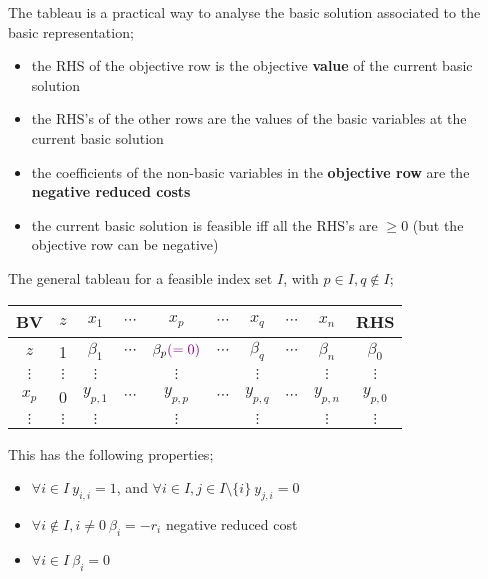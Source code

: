 \documentclass[a4paper, 12pt]{article}
\newcommand{\violet}[1]{\textcolor{violet}{#1}}
\begin{document}
                The tableau is a practical way to analyse the basic solution associated to the basic representation;
                \begin{itemize}
                    \itemsep0em
                    \item the RHS of the objective row is the objective \textbf{value} of the current basic solution
                    \item the RHS's of the other rows are the values of the basic variables at the current basic solution
                    \item the coefficients of the non-basic variables in the \textbf{objective row} are the \textbf{negative reduced costs}
                    \item the current basic solution is feasible iff all the RHS's are $\geq 0$ (but the objective row can be negative)
                \end{itemize}
                The general tableau for a feasible index set $I$, with $p \in I, q \notin I$;
                \begin{center}
                    \begin{tabular}{c|cccccccc|c}
                        BV & $z$ & $x_1$ & $\cdots$ & $x_p$ & $\cdots$ & $x_q$ & $\cdots$ & $x_n$ & RHS \\
                        \hline
                        $z$ & 1 & $\beta_1$ & $\cdots$ & $\beta_p \violet{(= 0)}$ & $\cdots$ & $\beta_q$ & $\cdots$ & $\beta_n$ & $\beta_0$ \\
                        $\vdots$ & $\vdots$ & $\vdots$ & & $\vdots$ & & $\vdots$ & & $\vdots$ & $\vdots$ \\
                        $x_p$ & 0 & $y_{p, 1}$ & $\cdots$ & $y_{p, p}$ & $\cdots$ & $y_{p, q}$ & $\cdots$ & $y_{p, n}$ & $y_{p, 0}$ \\
                        $\vdots$ & $\vdots$ & $\vdots$ & & $\vdots$ & & $\vdots$ & & $\vdots$ & $\vdots$ \\
                        \hline
                    \end{tabular}
                \end{center}
                This has the following properties;
                \begin{itemize}
                    \itemsep0em
                    \item $\forall i \in I\ y_{i, i} = 1$, and $\forall i \in I, j \in I \setminus \{i\}\ y_{j, i} = 0$
                    \item $\forall i \notin I, i \neq 0\ \beta_i = -r_i$ \hfill negative reduced cost
                    \item $\forall i \in I\ \beta_i = 0$
                \end{itemize}
\end{document}
